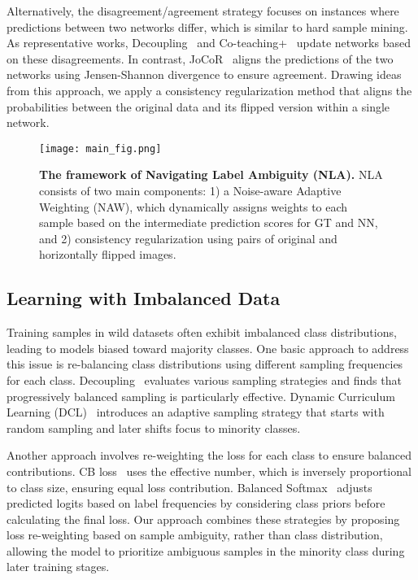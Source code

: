 Alternatively, the disagreement/agreement strategy focuses on instances where predictions between two networks differ, which is similar to hard sample mining. 
As representative works, Decoupling~\cite{malach2017decoupling} and Co-teaching+~\cite{yu2019does_coteaching+} update networks based on these disagreements. In contrast, JoCoR~\cite{wei2020combating_JoCoR} aligns the predictions of the two networks using Jensen-Shannon divergence to ensure agreement. Drawing ideas from this approach, we apply a consistency regularization method that aligns the probabilities between the original data and its flipped version within a single network.

\begin{figure*}[htb!]
    \centerline{\texttt{[image: main\_fig.png]}}
    \caption{\textbf{The framework of Navigating Label Ambiguity (NLA).} 
    NLA consists of two main components: 1) a Noise-aware Adaptive Weighting (NAW), which dynamically assigns weights to each sample based on the intermediate prediction scores for GT and NN, and 2) consistency regularization using pairs of original and horizontally flipped images.}
    \label{fig:main}
\end{figure*}

\subsection{Learning with Imbalanced Data}
Training samples in wild datasets often exhibit imbalanced class distributions, leading to models biased toward majority classes. One basic approach to address this issue is re-balancing class distributions using different sampling frequencies for each class. Decoupling~\cite{kang2019decoupling_imbalanced} evaluates various sampling strategies and finds that progressively balanced sampling is particularly effective. Dynamic Curriculum Learning (DCL)~\cite{wang2019dynamic_DCL} introduces an adaptive sampling strategy that starts with random sampling and later shifts focus to minority classes.

Another approach involves re-weighting the loss for each class to ensure balanced contributions. CB loss~\cite{cui2019class_CB} uses the effective number, which is inversely proportional to class size, ensuring equal loss contribution. Balanced Softmax~\cite{ren2020balanced} adjusts predicted logits based on label frequencies by considering class priors before calculating the final loss. Our approach combines these strategies by proposing loss re-weighting based on sample ambiguity, rather than class distribution, allowing the model to prioritize ambiguous samples in the minority class during later training stages.